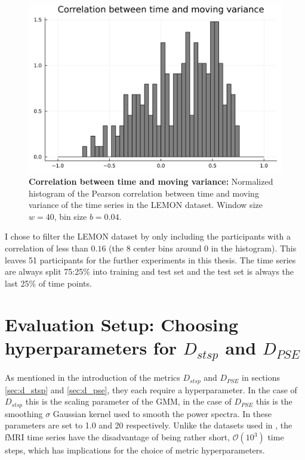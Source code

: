 \begin{figure}
    \includegraphics[width=\textwidth]{Images/smv_cor_histo.png}
    \caption[Correlation between time and moving variance]{\textbf{Correlation between time and moving variance: } Normalized histogram of the Pearson correlation between time 
    and moving variance of the time series in the LEMON dataset. Window size $w=40$, bin size $b=0.04$.}
    \label{fig:smv_cor_histo}
\end{figure}

I chose to filter the LEMON dataset by only including the participants with a correlation of less than $0.16$ (the 8 center bins around 0 in the histogram). This leaves 
51 participants for the further experiments in this thesis. The time series are always split 75:25\% into training and test set and the test set is always the 
last 25\% of time points.

\section{Evaluation Setup: Choosing hyperparameters for \texorpdfstring{$D_{stsp}$}{ Lg} and \texorpdfstring{$D_{PSE}$}{Lg}} \label{sec:eval_metrics_param}

As mentioned in the introduction of the metrics $D_{stsp}$ and $D_{PSE}$ in sections \ref{sec:d_stsp} and \ref{sec:d_pse}, they each require a hyperparameter. 
In the case of $D_{stsp}$ this is the scaling parameter of the GMM, in the case of $D_{PSE}$ this is the smoothing $\sigma$ Gaussian kernel used to smooth the 
power spectra. In \cite{brenner2022tractable} these parameters are set to 1.0 and 20 respectively. Unlike the datasets used in \cite{brenner2022tractable}, 
the fMRI time series have the disadvantage of being rather short, $\mathcal{O}(10^3)$ time steps, which has implications for the choice of metric hyperparameters.

